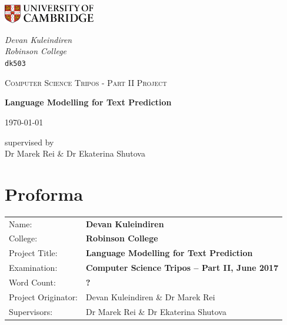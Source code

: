 \documentclass[a4paper, 12pt]{report}
\begin{document}
\begin{titlepage}
	\noindent
	\begin{minipage}[t][][t]{0.5\textwidth}
		\includegraphics[width=40mm]{./Images/CamLogo.jpg}
	\end{minipage}
	\begin{minipage}{0.5\textwidth}
	\begin{flushright}
		\large
		\textit{Devan Kuleindiren}
		\\
		\textit{Robinson College}
		\\
		\texttt{dk503}
	\end{flushright}
	\end{minipage}
	
	\begin{center}
	\vspace{6cm}
	{\scshape\large Computer Science Tripos - Part II Project\par}
	\vspace{0.5cm}
	{\huge\bfseries Language Modelling for Text Prediction\par}
	\vspace{0.5cm}
	{\large \today \par}
	\end{center}
	
	\vfill
	
	\begin{center}
	supervised by \\
	Dr Marek Rei \& Dr Ekaterina Shutova
	\end{center}
	
	\vspace{1.5cm}
\end{titlepage}


\pagestyle{plain}

\chapter*{Proforma}

{\large
\begin{tabular}{ll}
Name:               & \bf Devan Kuleindiren \\
College:            & \bf Robinson College \\
Project Title:      & \bf Language Modelling for Text Prediction \\
Examination:        & \bf Computer Science Tripos -- Part II, June 2017 \\
Word Count:         & \bf ? \\
Project Originator: & Devan Kuleindiren \& Dr Marek Rei \\
Supervisors:         & Dr Marek Rei \& Dr Ekaterina Shutova \\
\end{tabular}
}
\end{document}
